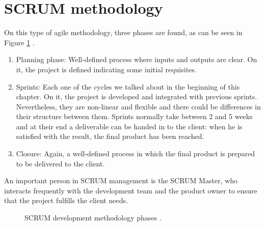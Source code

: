 \section{SCRUM methodology}
On this type of agile methodology, three phases are found, as can be seen in Figure \ref{fig:scrum-phases} \cite{schwaber1997scrum}.
\begin{enumerate}
    \item Planning phase: Well-defined process where inputs and outputs are clear. On it, the project is defined indicating some initial requisites.
    \item Sprints: Each one of the cycles we talked about in the beginning of this chapter. On it, the project is developed and integrated with previous sprints. Nevertheless, they are non-linear and flexible and there could be differences in their structure between them. Sprints normally take between 2 and 5 weeks and at their end a deliverable can be handed in to the client: when he is satisfied with the result, the final product has been reached.
    \item Closure: Again, a well-defined process in which the final product is prepared to be delivered to the client.
\end{enumerate}
An important person in SCRUM management is the SCRUM Master, who interacts frequently with the development team and the product owner to ensure that the project fulfills the client needs.

\begin{figure}[H]
\centering
    \caption{SCRUM development methodology phases \cite{schwaber1997scrum}.}
    \label{fig:scrum-phases}
\end{figure}

